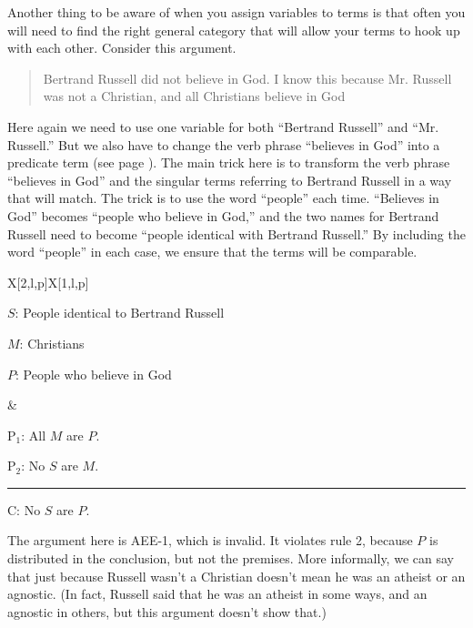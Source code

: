 Another thing to be aware of when you assign variables to terms is that often you will need to find the right general category that will allow your terms to hook up with each other. \label{finding_general_terms} Consider this argument.

\begin{quotation}
Bertrand Russell did not believe in God. I know this because Mr. Russell was not a Christian, and all Christians believe in God
\end{quotation}

Here again we need to use one variable for both ``Bertrand Russell'' and ``Mr. Russell.'' But we also have to change the verb phrase ``believes in God'' into a predicate term (see page \pageref{subsec:nonstandard_verbs}). The main trick here is to transform the verb phrase ``believes in God'' and the singular terms referring to Bertrand Russell in a way that will match. The trick is to use the word ``people'' each time. ``Believes in God'' becomes ``people who believe in God,'' and the two names for Bertrand Russell need to become ``people identical with Bertrand Russell.'' By including the word ``people'' in each case, we ensure that the terms will be comparable. 
 
\begin{tabu}{{X[2,l,p]X[1,l,p]}}

\begin{ekey}
\item[$S$:] People identical to Bertrand Russell
\item[$M$:] Christians
\item[$P$:] People who believe in God
\end{ekey}

&

\begin{earg}
\item[P$_1$:] All $M$ are $P$.
\item[P$_2$:] No $S$ are $M$.
\vspace{-.5em}
\item [] \rule{0.5\linewidth}{.5pt} 
\item[C:] No $S$ are $P$.
\end{earg} 

\end{tabu}

The argument here is AEE-1, which is invalid. It violates rule 2, because $P$ is distributed in the conclusion, but not the premises. More informally, we can say that just because Russell wasn't a Christian doesn't mean he was an atheist or an agnostic. (In fact, Russell said that he was an atheist in some ways, and an agnostic in others, but this argument doesn't show that.) 

